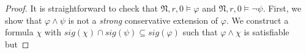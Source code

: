 \documentclass[10pt,a4paper]{amsart}
\theoremstyle{plain}
\theoremstyle{definition}
\newcommand{\sig}{\mathit{sig}}
\newcommand{\tiling}{\mathfrak T}
\newcommand{\fform}[1]{\boldsymbol{#1}}
\newcommand{\gvar}{\fform{g}}
\newcommand{\tvar}{\fform{t}}
\newcommand{\xvar}{\fform{x}}
\newcommand{\yvar}{\fform{y}}
\begin{document}
\begin{proof}
		It is straightforward to check that $\mathfrak{N},r,0\models \varphi$ and $\mathfrak{N},r,0\models \neg\psi$.
		First, we show that $\varphi \wedge \psi$ is not a 
		\emph{strong} conservative extension of $\varphi$.
		We construct a formula $\chi$ with $\sig(\chi) \cap \sig(\psi)\subseteq \sig(\varphi)$ such that $\varphi \wedge \chi$ is satisfiable but 

\end{proof}
\end{document}

